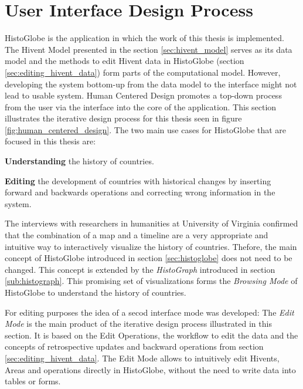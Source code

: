 


\section{User Interface Design Process} %
\label{sec:user_interface_design_process}

HistoGlobe is the application in which the work of this thesis is implemented. The Hivent Model presented in the section \ref{sec:hivent_model} serves as its data model and the methods to edit Hivent data in HistoGlobe (section \ref{sec:editing_hivent_data}) form parts of the computational model. However, developing the system bottom-up from the data model to the interface might not lead to usable system. Human Centered Design promotes a top-down process from the user via the interface into the core of the application. This section illustrates the iterative design process for this thesis seen in figure \ref{fig:human_centered_design}. The two main use cases for HistoGlobe that are focused in this thesis are:

\begin{compactenum}
  \item \textbf{Understanding} the history of countries.
  \item \textbf{Editing} the development of countries with historical changes by inserting forward and backwards operations and correcting wrong information in the system.
\end{compactenum}

The interviews with researchers in humanities at University of Virginia confirmed that the combination of a map and a timeline are a very appropriate and intuitive way to interactively visualize the history of countries. Thefore, the main concept of HistoGlobe introduced in section \ref{sec:histoglobe} does not need to be changed. This concept is extended by the \emph{HistoGraph} introduced in section \ref{sub:histograph}. This promising set of visualizations forms the \emph{Browsing Mode} of HistoGlobe to understand the history of countries.

For editing purposes the idea of a secod interface mode was developed: The \emph{Edit Mode} is the main product of the iterative design process illustrated in this section. It is based on the Edit Operations, the workflow to edit the data and the concepts of retrospective updates and backward operations from section \ref{sec:editing_hivent_data}. The Edit Mode allows to intuitively edit Hivents, Areas and operations directly in HistoGlobe, without the need to write data into tables or forms.

